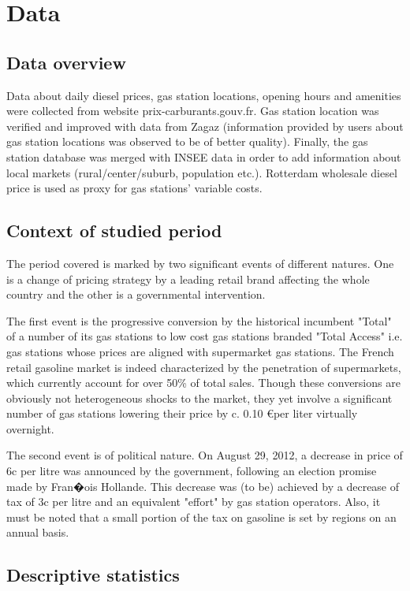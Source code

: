\documentclass[11pt]{article}
\begin{document}
\section{Data}

\subsection{Data overview}

Data about daily diesel prices, gas station locations, opening hours and amenities were collected from website prix-carburants.gouv.fr. Gas station location was verified and improved with data from Zagaz (information provided by users about gas station locations was observed to be of better quality). Finally, the gas station database was merged with INSEE data in order to add information about local markets (rural/center/suburb, population etc.). Rotterdam wholesale diesel price is used as proxy for gas stations' variable costs.

\subsection{Context of studied period}

The period covered is marked by two significant events of different natures. One is a change of pricing strategy by a leading retail brand affecting the whole country and the other is a governmental intervention.

The first event is the progressive conversion by the historical incumbent "Total" of a number of its gas stations to low cost gas stations branded "Total Access" i.e. gas stations whose prices are aligned with supermarket gas stations. The French retail gasoline market is indeed characterized by the penetration of supermarkets, which currently account for over 50\% of total sales. Though these conversions are obviously not heterogeneous shocks to the market, they yet involve a significant number of gas stations lowering their price by c. 0.10 \euro per liter virtually overnight.

The second event is of political nature.
On August 29, 2012, a decrease in price of 6c per litre was announced by the government, following an election promise made by Fran�ois Hollande. This decrease was (to be) achieved by a decrease of tax of 3c per litre and an equivalent "effort" by gas station operators. Also, it must be noted that a small portion of the tax on gasoline is set by regions on an annual basis.

\subsection{Descriptive statistics}
\end{document}
